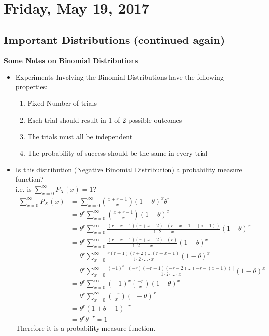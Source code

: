 \documentclass[12pt]{article}
\begin{document}
\section{Friday, May 19, 2017}

\subsection{Important Distributions (continued again)}
\textbf{Some Notes on Binomial Distributions}
\begin{itemize}
	\item{
	Experiments Involving the Binomial Distributions have the following properties:
	\begin{enumerate}
		\item{Fixed Number of trials}
		\item{Each trial should result in 1 of 2 possible outcomes}
		\item{The trials must all be independent}
		\item{The probability of success should be the same in every trial}
	\end{enumerate}
	}
	\item{
	Is this distribution (Negative Binomial Distribution) a probability measure function?\\
	i.e. is $\sum^\infty_{x=0} P_X (x) = 1$?
	\begin{align*}
		\sum^\infty_{x=0} P_X (x) &= \sum^\infty_{x=0} \binom{x+r - 1}{x} (1 - \theta)^x \theta^{r}\\
		&= \theta^{r} \sum^\infty_{x=0} \binom{x+r - 1}{x} (1 - \theta)^x\\
		&= \theta^{r} \sum^\infty_{x=0} \frac{(r+x-1)(r+x-2)...(r+x-1-(x-1))}{1 \cdot 2 \cdot ... \cdot x} (1 - \theta)^x\\
		&= \theta^{r} \sum^\infty_{x=0} \frac{(r+x-1)(r+x-2)...(r)}{1 \cdot 2 \cdot ... \cdot x} (1 - \theta)^x\\
		&= \theta^{r} \sum^\infty_{x=0} \frac{r(r+1)(r+2)...(r+x-1)}{1 \cdot 2 \cdot ... \cdot x} (1 - \theta)^x\\
		&= \theta^{r} \sum^\infty_{x=0} \frac{(-1)^x[(-r)(-r-1)(-r-2)...(-r-(x-1))]}{1 \cdot 2 \cdot ... \cdot x} (1 - \theta)^x\\
		&= \theta^{r} \sum^\infty_{x=0} (-1)^x \binom{-r}{x} (1 - \theta)^x\\
		&= \theta^{r} \sum^\infty_{x=0} \binom{-r}{x} (1 - \theta)^x\\
		&= \theta^{r} (1 + \theta - 1)^{-r}\\
		&= \theta^{r} \theta^{-r} = 1
	\end{align*}
	Therefore it is a probability measure function.

	}
\end{itemize}
\end{document}
